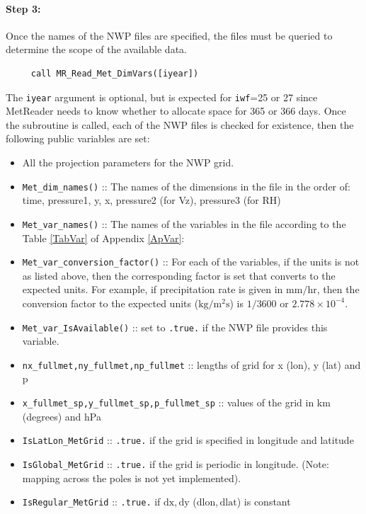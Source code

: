 \documentclass[11pt]{article}   %
\begin{document}
\paragraph{Step 3:} Once the names of the NWP files are specified, the files must
be queried to determine the scope of the available data.
\begin{verbatim}
     call MR_Read_Met_DimVars([iyear])
\end{verbatim}
The \texttt{iyear} argument is optional, but is expected for \texttt{iwf}=25 or 27
since MetReader needs to know whether to allocate space for 365 or 366 days.
Once the subroutine is called, each of the NWP files is checked for existence, then
the following public variables are set:
\begin{itemize}
\item All the projection parameters for the NWP grid.
\item \texttt{Met\_dim\_names()} :: The names of the dimensions in the file in the order of: time,
pressure1, y, x, pressure2 (for Vz), pressure3 (for RH)
\item \texttt{Met\_var\_names()} :: The names of the variables in the file according to the
Table \ref{TabVar} of Appendix \ref{ApVar}:
\item \texttt{Met\_var\_conversion\_factor()} :: For each of the variables, if the units
is not as listed above, then the corresponding factor is set that converts to the
expected units.  For example, if precipitation rate is given in $\mathrm{mm/hr}$, then
the conversion factor to the expected units ($\mathrm{kg/m^2s}$) is $1/3600$ or
$2.778 \times 10^{-4}$.
\item \texttt{Met\_var\_IsAvailable()} :: set to \texttt{.true.} if the NWP file
provides this variable.
\item \texttt{nx\_fullmet,ny\_fullmet,np\_fullmet} :: lengths of grid for x (lon), y (lat) and p
\item \texttt{x\_fullmet\_sp,y\_fullmet\_sp,p\_fullmet\_sp} :: values of the grid in km (degrees) and hPa
\item \texttt{IsLatLon\_MetGrid} :: \texttt{.true.} if the grid is specified in longitude and latitude
\item \texttt{IsGlobal\_MetGrid} :: \texttt{.true.} if the grid is periodic in longitude.  (Note:
mapping across the poles is not yet implemented).
\item \texttt{IsRegular\_MetGrid} :: \texttt{.true.} if $\mathrm{dx,dy}$ ($\mathrm{dlon,dlat}$) is constant
\end{itemize}
\end{document}

